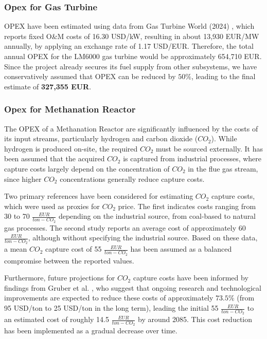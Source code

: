 \subsubsection{Opex for Gas Turbine}
OPEX have been estimated using data from Gas Turbine World (2024) \cite{GTW2024}, which reports fixed O\&M costs of 16.30 USD/kW, resulting in about 13,930 EUR/MW annually, by applying an exchange rate of 1.17 USD/EUR. Therefore, the total annual OPEX for the LM6000 gas turbine would be approximately 654,710 EUR. Since the project already secures its fuel supply from other subsystems, we have conservatively assumed that OPEX can be reduced by $50\%$, leading to the final estimate of \textbf{327,355 EUR}.

\subsubsection{Opex for Methanation Reactor}
The OPEX of a Methanation Reactor are significantly influenced by the costs of its input streams, particularly hydrogen and carbon dioxide ($CO_2$). While hydrogen is produced on-site, the required $CO_2$ must be sourced externally. It has been assumed that the acquired $CO_2$ is captured from industrial processes, where capture costs largely depend on the concentration of $CO_2$ in the flue gas stream, since higher $CO_2$ concentrations generally reduce capture costs.

Two primary references have been considered for estimating $CO_2$ capture costs, which were used as proxies for $CO_2$ price. The first \cite{GCCS2017} indicates costs ranging from 30 to 70 $\frac{EUR}{ton-CO_2}$ depending on the industrial source, from coal-based to natural gas processes. The second study \cite{Smith2024} reports an average cost of approximately 60 $\frac{EUR}{ton-CO_2}$, although without specifying the industrial source. Based on these data, a mean $CO_2$ capture cost of 55 $\frac{EUR}{ton-CO_2}$ has been assumed as a balanced compromise between the reported values.

Furthermore, future projections for $CO_2$ capture costs have been informed by findings from Gruber et al. \cite{Gruber2022}, who suggest that ongoing research and technological improvements are expected to reduce these costs of approximately $73.5\%$ (from 95 USD/ton to 25 USD/ton in the long term), leading the initial 55 $\frac{EUR}{ton-CO_2}$ to an estimated cost of roughly 14.5 $\frac{EUR}{ton-CO_2}$ by around 2085. This cost reduction has been implemented as a gradual decrease over time.

